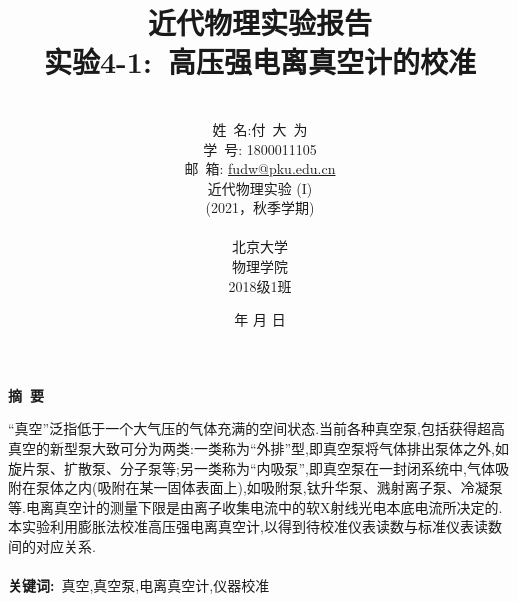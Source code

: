 \documentclass[a4paper]{article}
\begin{document}
\renewcommand{\contentsname}{目\ 录}
\renewcommand{\appendixname}{附录}
\renewcommand{\appendixpagename}{附录}
\renewcommand{\refname}{参考文献} 
\renewcommand{\figurename}{图}
\renewcommand{\tablename}{表}
\renewcommand{\today}{\number\year 年 \number\month 月 \number\day 日}
\newcommand{\refeq}[1]{\textbf{Eq.(\ref{#1})}}
\newcommand*{\circled}[1]{\lower.7ex\hbox{\tikz\draw (0pt, 0pt)%
    circle (.5em) node {\makebox[1em][c]{\small #1}};}}
    
\title{{\Huge 近代物理实验报告{\large\linebreak\\}}{\Large 实验4-1:\ 高压强电离真空计的校准\linebreak\linebreak}}
\author{\\姓\ 名:付\ 大\ 为\\
学\ 号: 1800011105\\
邮\ 箱: \url{fudw@pku.edu.cn}\\
近代物理实验 (I)\\
(2021，秋季学期)\\\\
北京大学\\
物理学院\\
2018级1班}
\date{\today}
\maketitle
\newpage

\begin{center}
{\Large\bf{摘\ 要\\}}
\end{center}

“真空”泛指低于一个大气压的气体充满的空间状态.当前各种真空泵,包括获得超高真空的新型泵大致可分为两类:一类称为“外排”型,即真空泵将气体排出泵体之外,如旋片泵、扩散泵、分子泵等;另一类称为“内吸泵”,即真空泵在一封闭系统中,气体吸附在泵体之内(吸附在某一固体表面上),如吸附泵,钛升华泵、溅射离子泵、冷凝泵等.电离真空计的测量下限是由离子收集电流中的软X射线光电本底电流所决定的.本实验利用膨胀法校准高压强电离真空计,以得到待校准仪表读数与标准仪表读数间的对应关系.
\\\\
{\bf{关键词}:}\ 真空,真空泵,电离真空计,仪器校准
\end{document}
